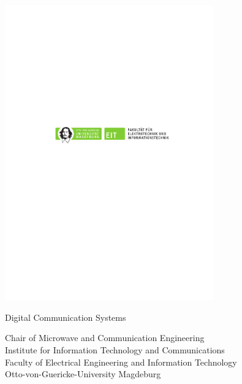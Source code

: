 %
%

\begin{titlepage}
	\begin{center}
		\normalsize

		\vspace*{1cm}
	
		\includegraphics[width=9cm]{../common/EIT_SIGN_ovgu}
		
		\vspace{1.5cm}
	
		\Huge
		Digital Communication Systems
		
		\vspace{0.75cm}
		
		\ifdefined\thesubtitle
		\Large
		\thesubtitle
		
		\vspace{0.75cm}
		\par
		\fi
		
		\normalsize
		\textbf{\thekindofdocument}
		
		\vspace{1.5cm}
		
		\normalsize
		Chair of Microwave and Communication Engineering \\
		Institute for Information Technology and Communications \\
		Faculty of Electrical Engineering and Information Technology \\
		Otto-von-Guericke-University Magdeburg
		

\end{center}
\end{titlepage}
